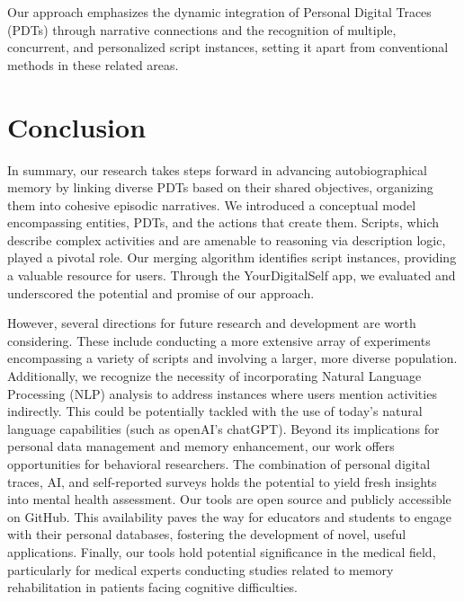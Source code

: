 \documentclass[11pt]{article}
\begin{document}
Our approach emphasizes the dynamic integration of Personal Digital Traces (PDTs) through narrative connections and the recognition of multiple, concurrent, and personalized script instances, setting it apart from conventional methods in these related areas.


\section{Conclusion}
In summary, our research takes steps forward in advancing autobiographical memory by linking diverse PDTs based on their shared objectives, organizing them into cohesive episodic narratives. We introduced a conceptual model encompassing entities, PDTs, and the actions that create them. Scripts, which describe complex activities and are amenable to reasoning via description logic, played a pivotal role. Our merging algorithm identifies script instances, providing a valuable resource for users.
Through the YourDigitalSelf app, we evaluated and underscored the potential and promise of our approach. 

However, several directions for future research and development are worth considering. These include conducting a more extensive array of experiments encompassing a variety of scripts and involving a larger, more diverse population. Additionally, we recognize the necessity of incorporating Natural Language Processing (NLP) analysis to address instances where users mention activities indirectly. This could be potentially tackled with the use of today's natural language capabilities (such as openAI's chatGPT).
Beyond its implications for personal data management and memory enhancement, our work offers  opportunities for behavioral researchers. The combination of personal digital traces, AI, and self-reported surveys holds the potential to yield fresh insights into mental health assessment. 
Our tools are open source and publicly accessible on GitHub. This availability paves the way for educators and students to engage with their personal databases, fostering the development of novel, useful applications. Finally, our tools hold potential significance in the medical field, particularly for medical experts conducting studies related to memory rehabilitation in patients facing cognitive difficulties.

 

\end{document}

